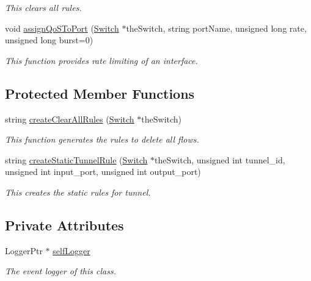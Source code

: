 \begin{DoxyCompactItemize}
\begin{DoxyCompactList}\small\item\em \-This clears all rules. \end{DoxyCompactList}\item 
void \hyperlink{classOVS__1__10_af9137ea35d766befdb2afa056234161d}{assign\-Qo\-S\-To\-Port} (\hyperlink{classSwitch}{\-Switch} $\ast$the\-Switch, string port\-Name, unsigned long rate, unsigned long burst=0)
\begin{DoxyCompactList}\small\item\em \-This function provides rate limiting of an interface. \end{DoxyCompactList}\end{DoxyCompactItemize}
\subsection*{\-Protected \-Member \-Functions}
\begin{DoxyCompactItemize}
\item 
string \hyperlink{classOVS__1__10_a58ac1dd99dcdd24c3b42fa42ae752c44}{create\-Clear\-All\-Rules} (\hyperlink{classSwitch}{\-Switch} $\ast$the\-Switch)
\begin{DoxyCompactList}\small\item\em \-This function generates the rules to delete all flows. \end{DoxyCompactList}\item 
string \hyperlink{classOVS__1__10_aec56ee8cfd0d0518b67cfce2749c802e}{create\-Static\-Tunnel\-Rule} (\hyperlink{classSwitch}{\-Switch} $\ast$the\-Switch, unsigned int tunnel\-\_\-id, unsigned int input\-\_\-port, unsigned int output\-\_\-port)
\begin{DoxyCompactList}\small\item\em \-This creates the static rules for tunnel. \end{DoxyCompactList}\end{DoxyCompactItemize}
\subsection*{\-Private \-Attributes}
\begin{DoxyCompactItemize}
\item 
\hypertarget{classOVS__1__10_aae70b6ba25237bad5c46087afc95ff44}{\-Logger\-Ptr $\ast$ \hyperlink{classOVS__1__10_aae70b6ba25237bad5c46087afc95ff44}{self\-Logger}}\label{classOVS__1__10_aae70b6ba25237bad5c46087afc95ff44}

\begin{DoxyCompactList}\small\item\em \-The event logger of this class. \end{DoxyCompactList}\end{DoxyCompactItemize}



